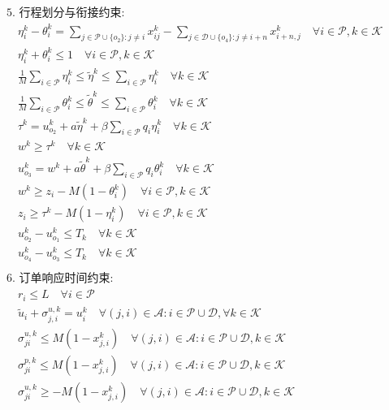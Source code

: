 \documentclass[11pt]{ctexart}
\begin{document}
\begin{align*}
\\
& \text{5. 行程划分与衔接约束:} \\
& \quad \eta_i^k - \theta_i^k = \sum_{j \in \mathcal{P} \cup \{o_2\}: j \neq i} x_{ij}^k - \sum_{j \in \mathcal{D} \cup \{o_4\}: j \neq i+n} x_{i+n, j}^k \quad \forall i \in \mathcal{P}, k \in \mathcal{K} \\
& \quad \eta_i^k + \theta_i^k \le 1 \quad \forall i \in \mathcal{P}, k \in \mathcal{K} \\
& \quad \frac{1}{M} \sum_{i \in \mathcal{P}} \eta_i^k \le \tilde{\eta}^k \le \sum_{i \in \mathcal{P}} \eta_i^k \quad \forall k \in \mathcal{K} \\
& \quad \frac{1}{M} \sum_{i \in \mathcal{P}} \theta_i^k \le \tilde{\theta}^k \le \sum_{i \in \mathcal{P}} \theta_i^k \quad \forall k \in \mathcal{K} \\
& \quad \tau^k = u_{o_2}^k + a \tilde{\eta}^k + \beta \sum_{i \in \mathcal{P}} q_i \eta_i^k \quad \forall k \in \mathcal{K} \\
& \quad w^k \ge \tau^k \quad \forall k \in \mathcal{K} \\
& \quad u_{o_3}^k = w^k + a \tilde{\theta}^k + \beta \sum_{i \in \mathcal{P}} q_i \theta_i^k \quad \forall k \in \mathcal{K} \\
& \quad w^k \ge z_i - M(1 - \theta_i^k) \quad \forall i \in \mathcal{P}, k \in \mathcal{K} \\
& \quad z_i \ge \tau^k - M(1 - \eta_i^k) \quad \forall i \in \mathcal{P}, k \in \mathcal{K} \\
& \quad u_{o_2}^k - u_{o_1}^k \le T_k \quad \forall k \in \mathcal{K} \\
& \quad u_{o_4}^k - u_{o_3}^k \le T_k \quad \forall k \in \mathcal{K} \\
\\
& \text{6. 订单响应时间约束:} \\
& \quad r_i \le L \quad \forall i \in \mathcal{P} \\
& \quad \tilde{u}_i + \sigma_{j, i}^{u,k} = u_i^k \quad \forall (j, i) \in \mathcal{A}: i \in \mathcal{P} \cup \mathcal{D}, \forall k \in \mathcal{K} \\
& \quad \sigma_{j i}^{u,k} \le M(1 - x_{j, i}^k) \quad \forall (j, i) \in \mathcal{A}: i \in \mathcal{P} \cup \mathcal{D}, k \in \mathcal{K} \\
& \quad \sigma_{j i}^{p,k} \le M(1 - x_{j, i}^k) \quad \forall (j, i) \in \mathcal{A}: i \in \mathcal{P} \cup \mathcal{D}, k \in \mathcal{K} \\
& \quad \sigma_{j i}^{u,k} \ge -M(1 - x_{j, i}^k) \quad \forall (j, i) \in \mathcal{A}: i \in \mathcal{P} \cup \mathcal{D}, k \in \mathcal{K} \\

\end{align*}
\end{document}
